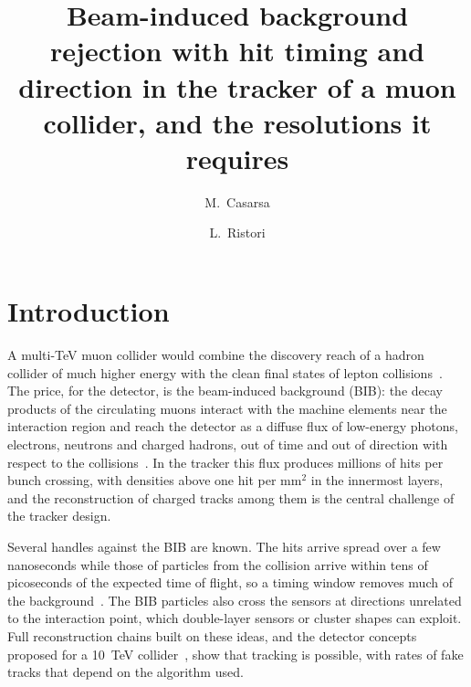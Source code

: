 \IfFileExists{jinst.cls}{\documentclass[a4paper,11pt]{jinst}}
\title{Beam-induced background rejection with hit timing and direction in the tracker of a muon
collider, and the resolutions it requires}
\author[a]{M.~Casarsa}
\author[b,1]{L.~Ristori\note{Corresponding author.}}
\affiliation[a]{INFN, Sezione di Trieste, Trieste, Italy}
\affiliation[b]{Fermi National Accelerator Laboratory, Batavia, IL 60510, USA}
\begin{document}
\flushbottom
\maketitle

\section{Introduction}\label{sec:intro}

A multi-TeV muon collider would combine the discovery reach of a hadron collider of much
higher energy with the clean final states of lepton
collisions~\cite{Accettura:2023,IMCC:2024interim}. The price, for the detector, is the
beam-induced background (BIB): the decay products of the circulating muons interact with the
machine elements near the interaction region and reach the detector as a diffuse flux of
low-energy photons, electrons, neutrons and charged hadrons, out of time and out of direction
with respect to the collisions~\cite{Bartosik:2020,Collamati:2021,Casarsa:2024review}. In the
tracker this flux produces millions of hits per bunch crossing, with densities above one hit per
mm$^2$ in the innermost layers, and the reconstruction of charged tracks among them is the
central challenge of the tracker design.

Several handles against the BIB are known. The hits arrive spread over a few nanoseconds while
those of particles from the collision arrive within tens of picoseconds of the expected time of
flight, so a timing window removes much of the
background~\cite{Bartosik:2020,Casarsa:2024review}. The BIB particles also cross the sensors at
directions unrelated to the interaction point, which double-layer sensors or cluster shapes can
exploit. Full reconstruction chains built on these ideas, and the detector concepts proposed for a
10~TeV collider~\cite{Andreetto:2026music,Bell:2025maia}, show that tracking is possible, with
rates of fake tracks that depend on the algorithm used.
\end{document}
